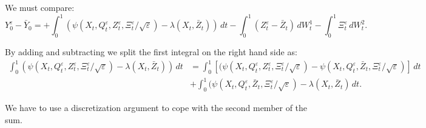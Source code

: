 \documentclass[reqno,a4paper,11 pt]{article}
\def \e {\varepsilon}
\numberwithin{equation}{section}
\begin{document}
We must compare:
$$
Y^\e _0 -\bar Y_0 =+ \int_0^1(\psi(X_t,Q^\e_t,Z^\e_t, \Xi^\e_t/\sqrt{\e} ) - \lambda({X}_t,\bar{Z}_t))\, dt -\int_0^1 (Z^\e_t-\bar{Z}_t)\,d W^1_t  -  \int_0^1\Xi^\e_t\,d W^2_t .$$

By adding and subtracting we split the first integral on the right hand side as:
\begin{align}\nonumber
 \int_0^1  (\psi(X_t,Q^\e_t,Z^\e_t,\Xi^\e_t/\sqrt{\e})-\lambda({X}_t,\bar{Z}_t))\,dt & =  
 \int_0^1  [(\psi({X}_t,Q^\e_t,{Z}^\e_t,\Xi^\e_t/\sqrt{\e})-\psi({X}_t,Q^\e_t,\bar{Z}_t,\Xi^\e_t/\sqrt{\e})] \,dt
\\ \label{primo_split}&+\int_0^1  (\psi({X}_t,Q^\e_t,\bar{Z}_t,\Xi^\e_t/\sqrt{\e}) -\lambda({X}_t,\bar{Z}_t)\,dt. \end{align}

We have to use a discretization argument to cope with the second member of the sum.

\end{document}
